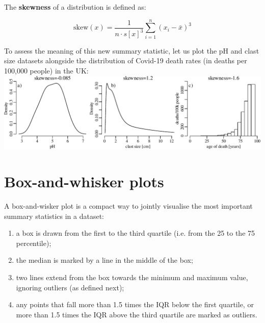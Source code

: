 The \textbf{skewness} of a distribution is defined as:

\begin{equation}
  \mbox{skew}(x) = \frac{1}{n \cdot s[x]^3}\sum\limits_{i=1}^{n}(x_i-\bar{x})^3
  \label{eq:skew}
\end{equation}

To assess the meaning of this new summary statistic, let us plot the
pH and clast size datasets alongside the distribution of Covid-19
death rates (in deaths per 100,000 people) in the UK:\\

\noindent\includegraphics[width=\textwidth]{../figures/skewness.pdf}
\begingroup
\endgroup

\section{Box-and-whisker plots}
\label{sec:boxplots}

A box-and-wisker plot is a compact way to jointly visualise the most
important summary statistics in a dataset:

\begin{enumerate}
\item a box is drawn from the first to the third quartile (i.e. from
  the 25 to the 75 percentile);
\item the median is marked by a line in the middle of the box;
\item two lines extend from the box towards the minimum and maximum
  value, ignoring outliers (as defined next);
\item any points that fall more than 1.5 times the IQR below the first
  quartile, or more than 1.5 times the IQR above the third quartile
  are marked as outliers.
\end{enumerate}


